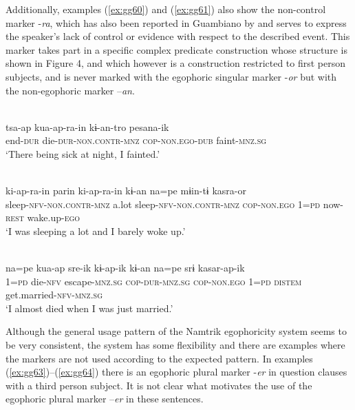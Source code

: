 \documentclass[output=paper]{langsci/langscibook}
\begin{document}
Additionally, examples (\ref{ex:gg60}) and (\ref{ex:gg61}) also show the non-control marker -\textit{ra}, which has also been reported in Guambiano by \citet[98--99]{Vasquez2007} and serves to express the speaker’s lack of control or evidence with respect to the described event. This marker takes part in a specific complex predicate construction whose structure is shown in Figure 4, %
and which however is a construction restricted to first person subjects, and is never marked with the egophoric singular marker -\textit{or} but with the non-egophoric marker –\textit{an}.


\ea \label{ex:gg60}
\\
	\gll tsa-ap	kua-ap-ra-in kɨ-an-tro	pesana-ik\\
	end-\textsc{dur} die-\textsc{dur-non.contr-mnz} \textsc{cop-non.ego-dub} faint-\textsc{mnz.sg}\\
	\glt ‘There being sick at night, I fainted.’  
\z

\ea \label{ex:gg61}
\\
	\gll ki-ap-ra-in	parin	ki-ap-ra-in	kɨ-an na=pe	mɨin-tɨ	kasra-or\\
	sleep-\textsc{nfv-non.contr-mnz} a.lot sleep-\textsc{nfv-non.contr-mnz} \textsc{cop-non.ego} 1=\textsc{pd} now-\textsc{rest} wake.up-\textsc{ego}\\
	\glt ‘‎‎I was sleeping a lot and I barely woke up.’ 
\z


\ea \label{ex:gg62}
\\
	\gll na=pe kua-ap sre-ik	kɨ-ap-ik kɨ-an na=pe srɨ kasar-ap-ik\\
	1=\textsc{pd}	 die-\textsc{nfv} escape-\textsc{mnz.sg} \textsc{cop-dur-mnz.sg} \textsc{cop-non.ego} 1=\textsc{pd} \textsc{distem}	get.married-\textsc{nfv-mnz.sg}\\
	\glt ‘I almost died when I was just married.’ 
\z


Although the general usage pattern of the Namtrik egophoricity system seems to be very consistent, the system has some flexibility and there are examples where the markers are not used according to the expected pattern. In examples (\ref{ex:gg63})--(\ref{ex:gg64}) there is an egophoric plural marker -\textit{er} in question clauses with a third person subject. It is not clear what motivates the use of the egophoric plural marker –\textit{er} in these sentences. 
\end{document}
